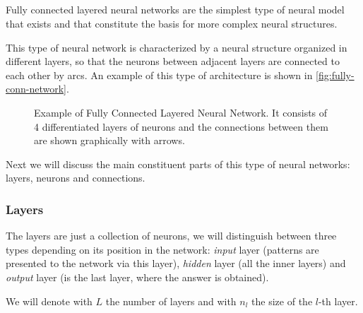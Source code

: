 \subsection{}\label{sec:fnn}

Fully connected layered neural networks are the simplest type of neural model
that exists and that constitute the basis for more complex neural structures.

This type of neural network is characterized by a neural structure organized in
different layers, so that the neurons between adjacent layers are connected to
each other by arcs. An example of this type of architecture is shown in
\vref{fig:fully-conn-network}.

\begin{figure}[ht]
  \centering
  
  \caption[Fully Connected Neural Network topology]{Example of Fully Connected
    Layered Neural Network. It consists of 4 differentiated layers of neurons
    and the connections between them are shown graphically with arrows.}
  \label{fig:fully-conn-network}
\end{figure}

Next we will discuss the main constituent parts of this type of neural
networks: layers, neurons and connections.

\subsubsection{Layers}
The layers are just a collection of neurons, we will distinguish between three
types depending on its position in the network: \emph{input} layer (patterns
are presented to the network via this layer), \emph{hidden} layer (all the
inner layers) and \emph{output} layer (is the last layer, where the answer is
obtained).

We will denote with \(L\) the number of layers and with \(n_l\) the size of the
\(l\)-th layer.

